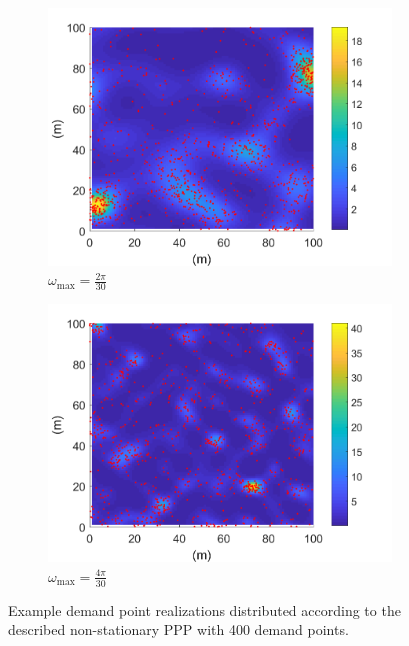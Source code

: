 \documentclass[12pt,dvipsnames]{report}
\begin{document}
\begin{figure}[!ht]
\centering
\begin{subfigure}{.45\textwidth}
	\centering
	\includegraphics[width=1\linewidth]{lambda_nsPPP-400_O2pi-300_L100000_X100_Y100}
	\caption{\small $\omega_{\max}=\frac{2 \pi}{30}$}
	\label{fig:lambda_nsPPP_2pi-300}
\end{subfigure}
\hspace{0.5cm}
\begin{subfigure}{.45\textwidth}
	\centering
	\includegraphics[width=1\linewidth]{lambda_nsPPP-400_O4pi-300_L100000_X100_Y100}
	\caption{\small $\omega_{\max}=\frac{4 \pi}{30}$}
	\label{fig:lambda_nsPPP_4pi-300}
\end{subfigure}
\caption[Realizations of example SSLT demand point distributions]{\small Example demand point realizations distributed according to the described non-stationary PPP with 400 demand points.}
\label{fig:lambda_nsPPP}
\end{figure}
\end{document}
